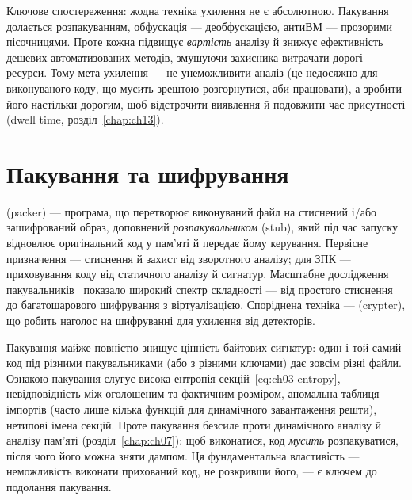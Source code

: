 Ключове спостереження: жодна техніка ухилення не є абсолютною. Пакування долається розпакуванням, обфускація --- деобфускацією, антиВМ --- прозорими пісочницями. Проте кожна підвищує \emph{вартість} аналізу й знижує ефективність дешевих автоматизованих методів, змушуючи захисника витрачати дорогі ресурси. Тому мета ухилення --- не унеможливити аналіз (це недосяжно для виконуваного коду, що мусить зрештою розгорнутися, аби працювати), а зробити його настільки дорогим, щоб відстрочити виявлення й подовжити час присутності (dwell time, розділ~\ref{chap:ch13}).

\section{Пакування та шифрування}\label{sec:ch08-packing}

 (packer) --- програма, що перетворює виконуваний файл на стиснений і/або зашифрований образ, доповнений \emph{розпакувальником} (stub), який під час запуску відновлює оригінальний код у пам'яті й передає йому керування. Первісне призначення --- стиснення й захист від зворотного аналізу; для ЗПК --- приховування коду від статичного аналізу й сигнатур. Масштабне дослідження пакувальників~\cite{ch08:ugarte} показало широкий спектр складності --- від простого стиснення до багатошарового шифрування з віртуалізацією. Споріднена техніка ---  (crypter), що робить наголос на шифруванні для ухилення від детекторів.

\begin{tikzfig}
\end{tikzfig}

Пакування майже повністю знищує цінність байтових сигнатур: один і той самий код під різними пакувальниками (або з різними ключами) дає зовсім різні файли. Ознакою пакування слугує висока ентропія секцій~\eqref{eq:ch03-entropy}, невідповідність між оголошеним та фактичним розміром, аномальна таблиця імпортів (часто лише кілька функцій для динамічного завантаження решти), нетипові імена секцій. Проте пакування безсиле проти динамічного аналізу й аналізу пам'яті (розділ~\ref{chap:ch07}): щоб виконатися, код \emph{мусить} розпакуватися, після чого його можна зняти дампом. Ця фундаментальна властивість --- неможливість виконати прихований код, не розкривши його, --- є ключем до подолання пакування.

